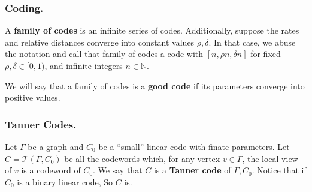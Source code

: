 \documentclass[usenames, aspectratio=169]{beamer}
\begin{document}
\begin{frame}
  \frametitle{ Coding. }
\begin{definition} 
  A \textbf{family of codes} is an infinite series of codes. Additionally, suppose the rates and relative distances converge into constant values $\rho,\delta$. In that case, we abuse the notation and call that family of codes a code with $[n, \rho n, \delta n]$ for fixed $\rho, \delta\in [ 0,1 )$, and infinite integers $n \in \mathbb{N}$.     
  \end{definition}
\begin{definition} 
  We will say that a family of codes is a \textbf{good code} if its parameters converge into positive values. 
  \end{definition}
\end{frame} 

\begin{frame}
  \frametitle{ Tanner Codes. }
  \begin{definition} Let $\Gamma$ be a graph and $C_{0}$ be a ``small'' linear code with finate parameters. Let $ C = \mathcal{T}\left( \Gamma, C_{0} \right)$  be all the codewords which, for any vertex $v\in \Gamma$, the local view of $v$ is a codeword of $C_{0}$. We say that $C$ is a \textbf{Tanner code}\label{Tan} of $\Gamma, C_{0}$. Notice that if $C_{0}$ is a binary linear code, So $C$ is.  
  \end{definition}
\end{frame}
\end{document}
